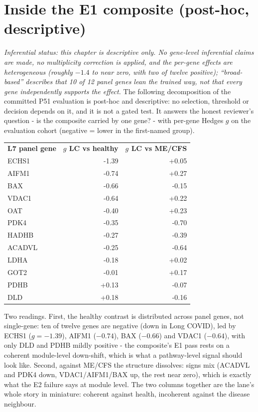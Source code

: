 \documentclass[11pt,a4paper]{article}
\begin{document}
\section{Inside the E1 composite (post-hoc, descriptive)}
\emph{Inferential status: this chapter is descriptive only. No gene-level
inferential claims are made, no multiplicity correction is applied, and the
per-gene effects are heterogeneous (roughly $-1.4$ to near zero, with two of
twelve positive); ``broad-based'' describes that 10 of 12 panel genes lean
the trained way, not that every gene independently supports the effect.}
The following decomposition of the committed P51 evaluation is post-hoc and
descriptive: no selection, threshold or decision depends on it, and it is not
a gated test. It answers the honest reviewer's question - is the composite
carried by one gene? - with per-gene Hedges $g$ on the evaluation cohort
(negative = lower in the first-named group).

\begin{longtable}{lrr}
\textbf{L7 panel gene} & \textbf{$g$ LC vs healthy} & \textbf{$g$ LC vs ME/CFS}\\
ECHS1 & -1.39 & +0.05 \\
AIFM1 & -0.74 & +0.27 \\
BAX & -0.66 & -0.15 \\
VDAC1 & -0.64 & +0.22 \\
OAT & -0.40 & +0.23 \\
PDK4 & -0.35 & -0.70 \\
HADHB & -0.27 & -0.39 \\
ACADVL & -0.25 & -0.64 \\
LDHA & -0.18 & +0.02 \\
GOT2 & -0.01 & +0.17 \\
PDHB & +0.13 & -0.07 \\
DLD & +0.18 & -0.16 \\
\end{longtable}

Two readings. First, the healthy contrast is distributed across panel
genes, not single-gene:
ten of twelve genes are negative (down in Long COVID), led by ECHS1
($g=-1.39$), AIFM1 ($-0.74$), BAX ($-0.66$) and VDAC1 ($-0.64$), with only
DLD and PDHB mildly positive - the composite's E1 pass rests on a coherent
module-level down-shift, which is what a pathway-level signal should look
like. Second, against ME/CFS the structure dissolves: signs mix (ACADVL and
PDK4 down, VDAC1/AIFM1/BAX up, the rest near zero), which is exactly what the
E2 failure says at module level. The two columns together are the lane's
whole story in miniature: coherent against health, incoherent against the
disease neighbour.
\end{document}
